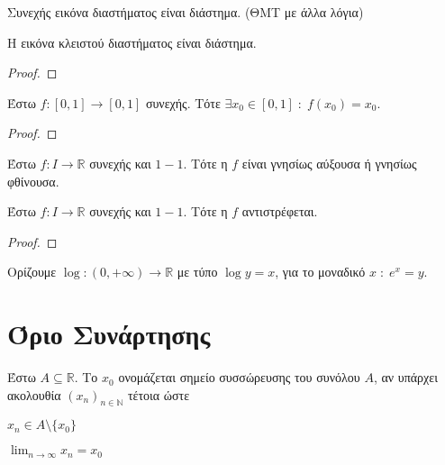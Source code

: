 \documentclass[main.tex]{subfiles}
\begin{document}
\begin{thm}
    Συνεχής εικόνα διαστήματος είναι διάστημα. (ΘΜΤ με άλλα λόγια)
\end{thm}

\begin{prop}
   Η εικόνα κλειστού διαστήματος είναι διάστημα. 
\end{prop}

\begin{proof}
    
\end{proof}

\begin{thm}
    Έστω $ f \colon [0,1] \to [0,1] $ συνεχής. Τότε $ \exists x_{0} \in [0,1] \; 
    : \; f(x_{0}) = x_{0} $.
\end{thm}

\begin{proof}
    
\end{proof}

\begin{thm}
    Έστω $ f \colon I \to \mathbb{R} $ συνεχής και $ 1 - 1 $. Τότε η $f$ είναι 
    γνησίως αύξουσα ή γνησίως φθίνουσα.
\end{thm}

\begin{thm}
    Έστω $ f \colon I \to \mathbb{R} $ συνεχής και $ 1 - 1 $. Τότε η $f$ αντιστρέφεται.
\end{thm}

\begin{proof}
    
\end{proof}

\begin{dfn}
    Ορίζουμε $ \log{} \colon (0,+ \infty) \to \mathbb{R} $ με τύπο $ \log{y} = x $, 
    για το μοναδικό $ x \; : \; e^{x} = y $.
\end{dfn}

\section{Όριο Συνάρτησης}

\begin{dfn}
    Έστω $ A \subseteq \mathbb{R} $. Το $ x_{0} $ ονομάζεται σημείο συσσώρευσης του 
    συνόλου $A$, αν υπάρχει ακολουθία $ (x_{n})_{n \in \mathbb{N}} $ τέτοια ώστε 
    \begin{myitemize}
    \item $ x_{n} \in A \setminus \{ x_{0} \} $
    \item $ \lim_{n \to \infty} x_{n} = x_{0} $
    \end{myitemize}
\end{dfn}
\end{document}
